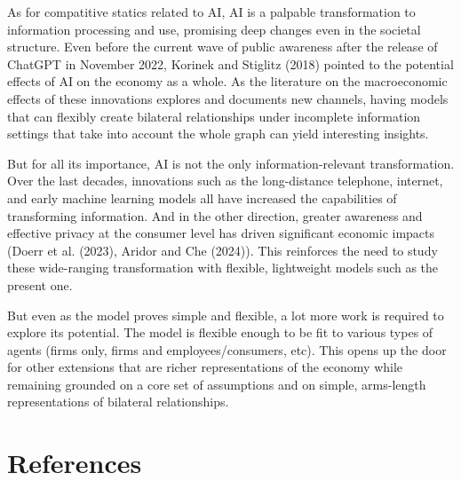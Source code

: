\documentclass[
]{article}
\theoremstyle{definition}
\theoremstyle{plain}
\theoremstyle{remark}
\begin{document}
As for compatitive statics related to AI, AI is a palpable
transformation to information processing and use, promising deep changes
even in the societal structure. Even before the current wave of public
awareness after the release of ChatGPT in November 2022, Korinek and
Stiglitz (2018) pointed to the potential effects of AI on the economy as
a whole. As the literature on the macroeconomic effects of these
innovations explores and documents new channels, having models that can
flexibly create bilateral relationships under incomplete information
settings that take into account the whole graph can yield interesting
insights.

But for all its importance, AI is not the only information-relevant
transformation. Over the last decades, innovations such as the
long-distance telephone, internet, and early machine learning models all
have increased the capabilities of transforming information. And in the
other direction, greater awareness and effective privacy at the consumer
level has driven significant economic impacts (Doerr et al. (2023),
Aridor and Che (2024)). This reinforces the need to study these
wide-ranging transformation with flexible, lightweight models such as
the present one.

But even as the model proves simple and flexible, a lot more work is
required to explore its potential. The model is flexible enough to be
fit to various types of agents (firms only, firms and
employees/consumers, etc). This opens up the door for other extensions
that are richer representations of the economy while remaining grounded
on a core set of assumptions and on simple, arms-length representations
of bilateral relationships.

\section{References}\label{references}
\end{document}
